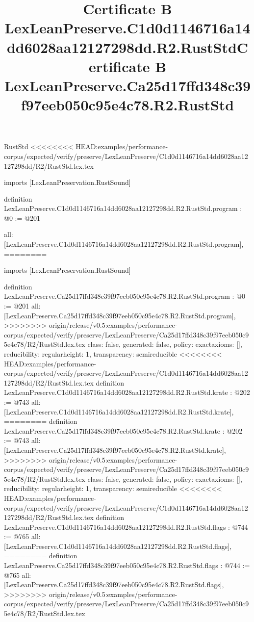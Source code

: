 \begin{lexlean}{RustStd}
<<<<<<<< HEAD:examples/performance-corpus/expected/verify/preserve/LexLeanPreserve/C1d0d1146716a14dd6028aa12127298dd/R2/RustStd.lex.tex
\title{Certificate B LexLeanPreserve.C1d0d1146716a14dd6028aa12127298dd.R2.RustStd}
\begin{coremodule}
imports [LexLeanPreservation.RustSound]

definition LexLeanPreserve.C1d0d1146716a14dd6028aa12127298dd.R2.RustStd.program : @0 := @201 {
  all: [LexLeanPreserve.C1d0d1146716a14dd6028aa12127298dd.R2.RustStd.program],
========
\title{Certificate B LexLeanPreserve.Ca25d17ffd348c39f97eeb050c95e4c78.R2.RustStd}
\begin{coremodule}
imports [LexLeanPreservation.RustSound]

definition LexLeanPreserve.Ca25d17ffd348c39f97eeb050c95e4c78.R2.RustStd.program : @0 := @201 {
  all: [LexLeanPreserve.Ca25d17ffd348c39f97eeb050c95e4c78.R2.RustStd.program],
>>>>>>>> origin/release/v0.5:examples/performance-corpus/expected/verify/preserve/LexLeanPreserve/Ca25d17ffd348c39f97eeb050c95e4c78/R2/RustStd.lex.tex
  class: false,
  generated: false,
  policy: exact{axioms: []},
  reducibility: regular{height: 1},
  transparency: semireducible
}
<<<<<<<< HEAD:examples/performance-corpus/expected/verify/preserve/LexLeanPreserve/C1d0d1146716a14dd6028aa12127298dd/R2/RustStd.lex.tex
definition LexLeanPreserve.C1d0d1146716a14dd6028aa12127298dd.R2.RustStd.krate : @202 := @743 {
  all: [LexLeanPreserve.C1d0d1146716a14dd6028aa12127298dd.R2.RustStd.krate],
========
definition LexLeanPreserve.Ca25d17ffd348c39f97eeb050c95e4c78.R2.RustStd.krate : @202 := @743 {
  all: [LexLeanPreserve.Ca25d17ffd348c39f97eeb050c95e4c78.R2.RustStd.krate],
>>>>>>>> origin/release/v0.5:examples/performance-corpus/expected/verify/preserve/LexLeanPreserve/Ca25d17ffd348c39f97eeb050c95e4c78/R2/RustStd.lex.tex
  class: false,
  generated: false,
  policy: exact{axioms: []},
  reducibility: regular{height: 1},
  transparency: semireducible
}
<<<<<<<< HEAD:examples/performance-corpus/expected/verify/preserve/LexLeanPreserve/C1d0d1146716a14dd6028aa12127298dd/R2/RustStd.lex.tex
definition LexLeanPreserve.C1d0d1146716a14dd6028aa12127298dd.R2.RustStd.flags : @744 := @765 {
  all: [LexLeanPreserve.C1d0d1146716a14dd6028aa12127298dd.R2.RustStd.flags],
========
definition LexLeanPreserve.Ca25d17ffd348c39f97eeb050c95e4c78.R2.RustStd.flags : @744 := @765 {
  all: [LexLeanPreserve.Ca25d17ffd348c39f97eeb050c95e4c78.R2.RustStd.flags],
>>>>>>>> origin/release/v0.5:examples/performance-corpus/expected/verify/preserve/LexLeanPreserve/Ca25d17ffd348c39f97eeb050c95e4c78/R2/RustStd.lex.tex
}}}
\end{coremodule}}
\end{coremodule}
\end{lexlean}
